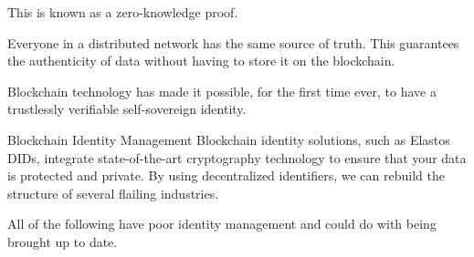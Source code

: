 This is known as a zero-knowledge proof.

Everyone in a distributed network has the same source of truth. This guarantees the authenticity of data without having to store it on the blockchain.

Blockchain technology has made it possible, for the first time ever, to have a trustlessly verifiable self-sovereign identity.

Blockchain Identity Management
Blockchain identity solutions, such as Elastos DIDs, integrate state-of-the-art cryptography technology to ensure that your data is protected and private. By using decentralized identifiers, we can rebuild the structure of several flailing industries. 

All of the following have poor identity management and could do with being brought up to date.






